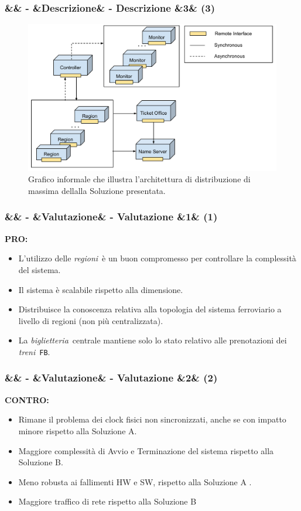 \documentclass[slidestop,compress,blackandwhite]{beamer}
\newcommand{\ttt}[1]{\texttt{#1}}
\newcommand{\ii}[1]{\textit{#1}}
\newcommand{\treni}{\ii{treni}}
\newcommand{\biglietteria}{\ii{biglietteria}}
\newcommand{\regioni}{\ii{regioni}}
\newcommand{\PRO}{\textbf{PRO:}}
\newcommand{\CONTRO}{\textbf{CONTRO:}}
\newcommand{\newtitle}[4]{
	#1 
	\ifx&#2&%
	\else
  		\large- #2
	\fi
	\ifx&#3&%
	\else
  		\normalsize- #3
	\fi
	\ifx&#4&%
	\else
  		\normalsize (#4)
	\fi
}
\newcommand{\newframe}[5]{
	\begin{frame}
		\frametitle{\newtitle{#1}{#2}{#3}{#4}}
		#5
	\end{frame}
}
\begin{document}
	\newframe{}{}{Descrizione}{3}{
	\begin{figure}
			\includegraphics[scale=0.28,trim=0mm 0mm 0mm 20mm]{imgs/solution.pdf}
			\caption{\small Grafico informale che illustra l'architettura di distribuzione di massima dellalla Soluzione presentata.}
		\end{figure}
	}
	
	\newframe{}{}{Valutazione}{1}{
		\vspace{0.5cm}
		\PRO
		\begin{itemize}
			\item L'utilizzo delle \regioni~è un buon compromesso per controllare la complessità del sistema.
			\item Il sistema è scalabile rispetto alla dimensione.
			\item Distribuisce la conoscenza relativa alla topologia del sistema ferroviario a livello di regioni (non più centralizzata).
			\item La \biglietteria~centrale mantiene solo lo stato relativo alle prenotazioni dei \treni~\ttt{FB}.
		\end{itemize}
	
	}
	
	\newframe{}{}{Valutazione}{2}{
		\vspace{0.5cm}
		\CONTRO
		\begin{itemize}
			\item Rimane il problema dei clock fisici non sincronizzati, anche se con impatto minore rispetto alla Soluzione A.
			\item Maggiore complessità di Avvio e Terminazione del sistema rispetto alla Soluzione B.
			\item Meno robusta ai fallimenti HW e SW, rispetto alla Soluzione A .
			\item Maggiore traffico di rete rispetto alla Soluzione B
		\end{itemize}
	}
	
\end{document}
